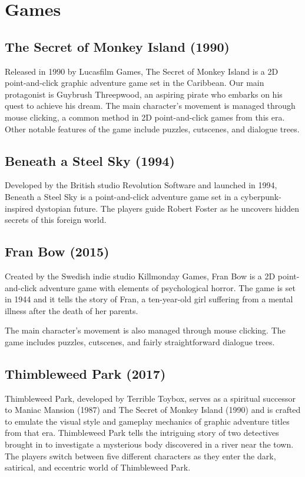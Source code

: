 \section{Games}
\subsection{The Secret of Monkey Island (1990)}
Released in 1990 by Lucasfilm Games, The Secret of Monkey Island is a 2D point-and-click graphic adventure game set in the Caribbean. Our main protagonist is Guybrush Threepwood, an aspiring pirate who embarks on his quest to achieve his dream.
The main character's movement is managed through mouse clicking, a common method in 2D point-and-click games from this era. Other notable features of the game include puzzles, cutscenes, and dialogue trees. 

\subsection{Beneath a Steel Sky (1994)}
Developed by the British studio Revolution Software and launched in 1994, Beneath a Steel Sky is a point-and-click adventure game set in a cyberpunk-inspired dystopian future. The players guide Robert Foster as he uncovers hidden secrets of this foreign world.


\subsection{Fran Bow (2015)}
Created by the Swedish indie studio Killmonday Games, Fran Bow is a 2D point-and-click adventure game with elements of psychological horror. The game is set in 1944 and it tells the story of Fran, a ten-year-old girl suffering from a mental illness after the death of her parents.

The main character's movement is also managed through mouse clicking. The game includes puzzles, cutscenes, and fairly straightforward dialogue trees.




\subsection{Thimbleweed Park (2017)}
Thimbleweed Park, developed by Terrible Toybox, serves as a spiritual successor to Maniac Mansion (1987) and The Secret of Monkey Island (1990) and is crafted to emulate the visual style and gameplay mechanics of graphic adventure titles from that era. Thimbleweed Park tells the intriguing story of two detectives brought in to investigate a mysterious body discovered in a river near the town. The players switch between five different characters as they enter the dark, satirical, and eccentric world of Thimbleweed Park\cite{Matulef2014}.

